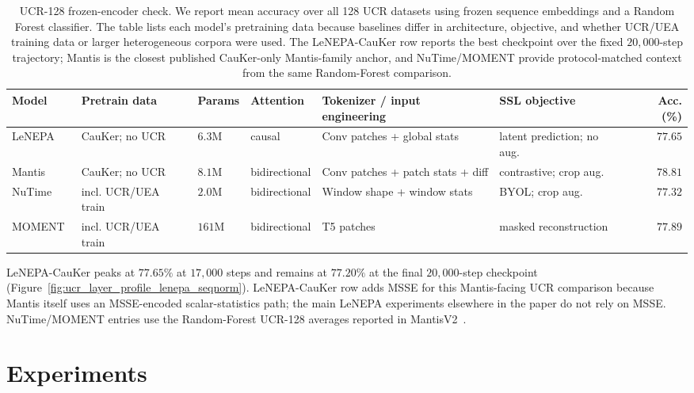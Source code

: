 \documentclass[sigconf,anonymous,review]{acmart}
\begin{document}


\begin{table}[t]
\centering
\caption{UCR-128 frozen-encoder check. We report mean accuracy over all 128 UCR datasets using frozen sequence embeddings and a Random Forest classifier. The table lists each model's pretraining data because baselines differ in architecture, objective, and whether UCR/UEA training data or larger heterogeneous corpora were used. The LeNEPA-CauKer row reports the best checkpoint over the fixed $20{,}000$-step trajectory; Mantis is the closest published CauKer-only Mantis-family anchor, and NuTime/MOMENT provide protocol-matched context from the same Random-Forest comparison.}
\label{tab:ucr_mantis_comparison}
\small
\setlength{\tabcolsep}{3pt}
\begin{tabularx}{\textwidth}{l X l l X X r}
\toprule
Model & Pretrain data & Params & Attention & Tokenizer / input engineering & SSL objective & Acc. (\%) \\
\midrule
LeNEPA
  & CauKer; no UCR
  & $6.3$M
  & causal
  & Conv patches + global stats
  & latent prediction; no aug.
  & $\mathbf{77.65}$ \\
Mantis
  & CauKer; no UCR
  & $8.1$M
  & bidirectional
  & Conv patches + patch stats + diff
  & contrastive; crop aug.
  & $78.81$ \\
NuTime~\citep{lin2024nutime}
  & incl. UCR/UEA train
  & $2.0$M
  & bidirectional
  & Window shape + window stats
  & BYOL; crop aug.
  & $77.32$ \\
MOMENT~\citep{goswami2024moment}
  & incl. UCR/UEA train
  & $161$M
  & bidirectional
  & T5 patches
  & masked reconstruction
  & $77.89$ \\
\bottomrule
\end{tabularx}
\vspace{0.25em}
\footnotesize
LeNEPA-CauKer peaks at $77.65\%$ at $17{,}000$ steps and remains at $77.20\%$ at the final $20{,}000$-step checkpoint (Figure~\ref{fig:ucr_layer_profile_lenepa_seqnorm}).
LeNEPA-CauKer row adds MSSE for this Mantis-facing UCR comparison because Mantis itself uses an MSSE-encoded scalar-statistics path; the main LeNEPA experiments elsewhere in the paper do not rely on MSSE.
NuTime/MOMENT entries use the Random-Forest UCR-128 averages reported in MantisV2~\citep{feofanov2026mantisv2}.
\end{table}

\section{Experiments}
\label{sec:experiments}
\end{document}
